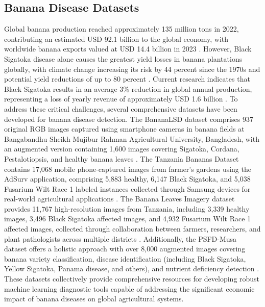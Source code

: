 \documentclass[sn-mathphys]{sn-jnl}
\theoremstyle{thmstyleone}%
\theoremstyle{thmstyletwo}%
\theoremstyle{thmstylethree}%
\begin{document}
\subsection{Banana Disease Datasets}
Global banana production reached approximately 135 million tons in 2022, contributing an estimated USD 92.1 billion to the global economy, with worldwide banana exports valued at USD 14.4 billion in 2023 \citep{fao2024banana}. However, Black Sigatoka disease alone causes the greatest yield losses in banana plantations globally, with climate change increasing its risk by 44 percent since the 1970s and potential yield reductions of up to 80 percent \citep{bebber2020climate}. Current research indicates that Black Sigatoka results in an average 3\% reduction in global annual production, representing a loss of yearly revenue of approximately USD 1.6 billion \citep{bebber2020climate}. To address these critical challenges, several comprehensive datasets have been developed for banana disease detection. The BananaLSD dataset comprises 937 original RGB images captured using smartphone cameras in banana fields at Bangabandhu Sheikh Mujibur Rahman Agricultural University, Bangladesh, with an augmented version containing 1,600 images covering Sigatoka, Cordana, Pestalotiopsis, and healthy banana leaves \citep{arman2023bananalsd}. The Tanzania Bananas Dataset contains 17,068 mobile phone-captured images from farmer's gardens using the AdSurv application, comprising 5,883 healthy, 6,147 Black Sigatoka, and 5,038 Fusarium Wilt Race 1 labeled instances collected through Samsung devices for real-world agricultural applications \citep{mduma2022nelson}. The Banana Leaves Imagery dataset provides 11,767 high-resolution images from Tanzania, including 3,339 healthy images, 3,496 Black Sigatoka affected images, and 4,932 Fusarium Wilt Race 1 affected images, collected through collaboration between farmers, researchers, and plant pathologists across multiple districts \citep{mduma2025banana}. Additionally, the PSFD-Musa dataset offers a holistic approach with over 8,000 augmented images covering banana variety classification, disease identification (including Black Sigatoka, Yellow Sigatoka, Panama disease, and others), and nutrient deficiency detection \citep{medhi2022psfd}. These datasets collectively provide comprehensive resources for developing robust machine learning diagnostic tools capable of addressing the significant economic impact of banana diseases on global agricultural systems.
\end{document}
